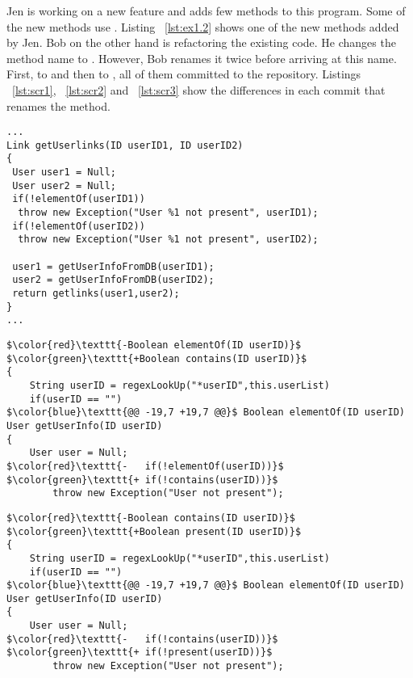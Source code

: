 Jen is working on a new feature and adds few methods to this program. Some of the new methods use . Listing ~\ref{lst:ex1.2} shows one of the new methods added by Jen.
Bob on the other hand is refactoring the existing code. He changes the method name  to . However, Bob renames it twice before arriving at this name. First, to  and then to , all of them committed to the repository. Listings ~\ref{lst:scr1}, ~\ref{lst:scr2} and ~\ref{lst:scr3} show the differences in each commit that renames the  method.

\begin{lstlisting}[caption= Code snippet, label=lst:ex1.2, gobble=0, basicstyle=\ttfamily\small]
...
Link getUserlinks(ID userID1, ID userID2)
{
 User user1 = Null;
 User user2 = Null;
 if(!elementOf(userID1))
  throw new Exception("User %1 not present", userID1);
 if(!elementOf(userID2))
  throw new Exception("User %1 not present", userID2);
  
 user1 = getUserInfoFromDB(userID1);
 user2 = getUserInfoFromDB(userID2);
 return getlinks(user1,user2);
}
...
\end{lstlisting}


\begin{lstlisting}[caption= Renamed to \ttf{contains}, label=lst:scr1, gobble=0, basicstyle=\ttfamily\small]
$\color{red}\texttt{-Boolean elementOf(ID userID)}$
$\color{green}\texttt{+Boolean contains(ID userID)}$
{
	String userID = regexLookUp("*userID",this.userList)
	if(userID == "")
$\color{blue}\texttt{@@ -19,7 +19,7 @@}$ Boolean elementOf(ID userID)
User getUserInfo(ID userID)
{
	User user = Null;
$\color{red}\texttt{-	if(!elementOf(userID))}$
$\color{green}\texttt{+	if(!contains(userID))}$
		throw new Exception("User not present");
\end{lstlisting}

\begin{lstlisting}[caption= Renamed to \ttf{present}, label=lst:scr2, gobble=0, basicstyle=\ttfamily\small]
$\color{red}\texttt{-Boolean contains(ID userID)}$
$\color{green}\texttt{+Boolean present(ID userID)}$
{
	String userID = regexLookUp("*userID",this.userList)
	if(userID == "")
$\color{blue}\texttt{@@ -19,7 +19,7 @@}$ Boolean elementOf(ID userID)
User getUserInfo(ID userID)
{
	User user = Null;
$\color{red}\texttt{-	if(!contains(userID))}$
$\color{green}\texttt{+	if(!present(userID))}$
		throw new Exception("User not present");
\end{lstlisting}

